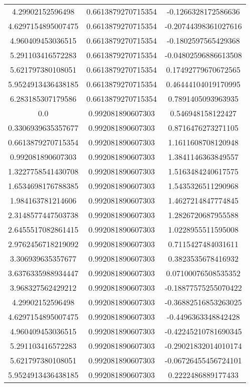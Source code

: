 \begin{table}
\begin{tabular}{ccc}
4.29902152596498 & 0.6613879270715354 & -0.1266328172586636 \\
4.6297154895007475 & 0.6613879270715354 & -0.20744398361027616 \\
4.960409453036515 & 0.6613879270715354 & -0.1802597565429368 \\
5.291103416572283 & 0.6613879270715354 & -0.04802596886613508 \\
5.621797380108051 & 0.6613879270715354 & 0.17492779670672565 \\
5.9524913436438185 & 0.6613879270715354 & 0.46444104019170995 \\
6.283185307179586 & 0.6613879270715354 & 0.7891405093963935 \\
0.0 & 0.992081890607303 & 0.546948158122427 \\
0.3306939635357677 & 0.992081890607303 & 0.8716476273271105 \\
0.6613879270715354 & 0.992081890607303 & 1.1611608708120948 \\
0.992081890607303 & 0.992081890607303 & 1.3841146363849557 \\
1.3227758541430708 & 0.992081890607303 & 1.5163484240617575 \\
1.6534698176788385 & 0.992081890607303 & 1.5435326511290968 \\
1.984163781214606 & 0.992081890607303 & 1.4627214847774845 \\
2.3148577447503738 & 0.992081890607303 & 1.2826720687955588 \\
2.6455517082861415 & 0.992081890607303 & 1.0228955511595008 \\
2.9762456718219092 & 0.992081890607303 & 0.7115427484031611 \\
3.306939635357677 & 0.992081890607303 & 0.3823535678416932 \\
3.6376335988934447 & 0.992081890607303 & 0.07100076508535352 \\
3.968327562429212 & 0.992081890607303 & -0.18877575255070422 \\
4.29902152596498 & 0.992081890607303 & -0.36882516853263025 \\
4.6297154895007475 & 0.992081890607303 & -0.4496363348842428 \\
4.960409453036515 & 0.992081890607303 & -0.42245210781690345 \\
5.291103416572283 & 0.992081890607303 & -0.29021832014010174 \\
5.621797380108051 & 0.992081890607303 & -0.06726455456724101 \\
5.9524913436438185 & 0.992081890607303 & 0.2222486889177433 \\

\end{tabular}
\end{table}
